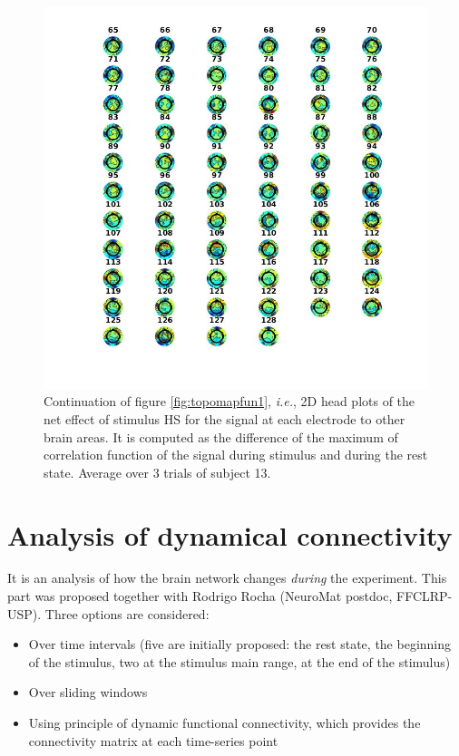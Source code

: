 \documentclass[a4paper]{article}
\begin{document}
\begin{figure}
    \centering
    \includegraphics[width=16cm]{HS2.jpg}
    \caption{Continuation of figure \ref{fig:topomapfun1}, \textit{i.e.}, 2D head plots of the net effect of stimulus HS for the signal at each electrode to other brain areas. It is computed as the difference of the maximum of correlation function of the signal during stimulus and during the rest state. Average over 3 trials of subject 13.}
    \label{fig:hs2}
\end{figure}

\newpage
\section{Analysis of dynamical connectivity}

It is an analysis of how the brain network changes \emph{during} the experiment. This part was proposed together with Rodrigo Rocha (NeuroMat postdoc, FFCLRP-USP). Three options are considered:

\begin{itemize}
    \item Over time intervals (five are initially proposed: the rest state, the beginning of the stimulus, two at the stimulus main range, at the end of the stimulus)
    \item Over sliding windows
    \item Using principle of dynamic functional connectivity, which provides the connectivity matrix at each time-series point
\end{itemize}
\end{document}
